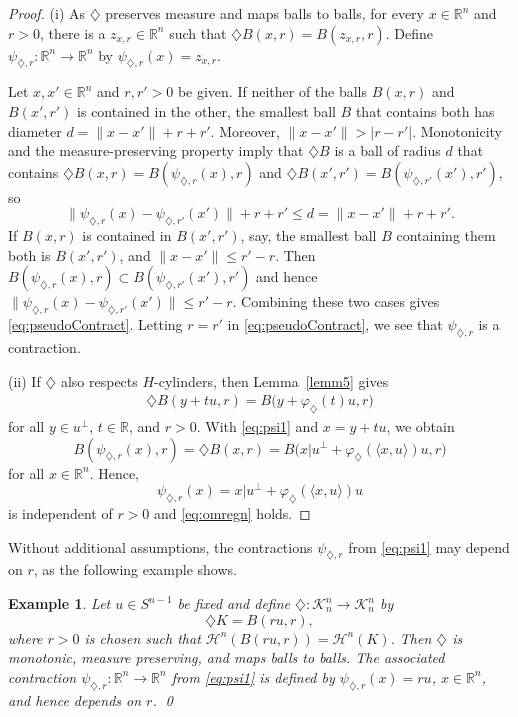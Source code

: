 \documentclass[12pt,reqno]{amsart}
\newcommand{\R}{{\mathbb R}}
\newcommand{\cH}{{\mathcal H}}
\newcommand{\cK}{\mathcal K}
\newtheorem{ex}[thm]{Example}
\newcommand{\di}{\diamondsuit}
\numberwithin{equation}{section}
\begin{document}
\begin{proof}
(i) As $\di$ preserves measure and maps balls to balls, for every $x\in \R^n$ and $r>0$, there is a $z_{x,r}\in \R^n$ such that $\di B(x,r)=B(z_{x,r},r)$.  Define $\psi_{\di,r}:\R^n\to \R^n$ by $\psi_{\di,r}(x)=z_{x,r}$.

Let $x,x'\in \R^n$ and $r,r'>0$ be given. If neither of the balls $B(x,r)$ and $B(x',r')$ is contained in the other, the smallest ball $B$ that contains both has diameter $d=\|x-x'\|+r+r'$.  Moreover, $\|x-x'\|>|r-r'|$.
Monotonicity and the measure-preserving property imply that
$\di B$ is a ball of radius $d$ that contains $\di B(x,r)=B(\psi_{\di,r}(x),r)$ and $\di B(x',r')=B(\psi_{\di,r'}(x'),r')$, so
\[
\|\psi_{\di,r}(x)-\psi_{\di,r'}(x')\|+r+r'\le d= \|x-x'\|+r+r'.
\]
If $B(x,r)$ is contained in $B(x',r')$, say, the smallest ball $B$ containing them both is $B(x',r')$, and $\|x-x'\|\le r'-r$.  Then $B(\psi_{\di,r}(x),r)\subset B(\psi_{\di,r'}(x'),r')$ and hence
$\|\psi_{\di,r}(x)-\psi_{\di,r'}(x')\|\le  r'-r$. Combining these two cases gives \eqref{eq:pseudoContract}.  Letting $r=r'$ in \eqref{eq:pseudoContract}, we see that $\psi_{\di,r}$ is a contraction.

(ii) If $\di$ also respects $H$-cylinders, then Lemma~\ref{lemm5} gives
\begin{align*}%
\di B(y+tu,r)=B\big(y+\varphi_{\di}(t)u,r\big)
\end{align*}
for all $y\in u^\perp$, $t\in \R$, and $r>0$. With \eqref{eq:psi1} and $x=y+tu$, we obtain
$$B(\psi_{\di,r}(x),r)=\di B(x,r)=
B\big(x|u^\perp+\varphi_{\di}(\langle x,u\rangle) u,r\big)$$
for all $x\in \R^n$.  Hence,
\[
\psi_{\di,r}(x)=x|u^\perp+\varphi_{\di}(\langle x,u\rangle)u
\]
is independent of $r>0$ and \eqref{eq:omregn} holds.
\end{proof}

Without additional assumptions, the contractions $\psi_{\di,r}$ from \eqref{eq:psi1} may depend on $r$, as the following example shows.

\begin{ex}
{\em Let $u\in S^{n-1}$ be fixed and define $\di:\cK_n^n\to \cK_n^n$ by
\[
\di K=B(ru,r),
\]
where $r>0$ is chosen such that $\cH^n(B(ru,r))=\cH^n(K)$. Then $\di$ is monotonic, measure preserving, and maps balls to balls.  The associated contraction $\psi_{\di,r}:\R^n\to\R^n$ from \eqref{eq:psi1} is defined by $\psi_{\di,r}(x)=ru$, $x\in \R^n$, and hence depends on $r$.} \qed
\end{ex}
\end{document}
